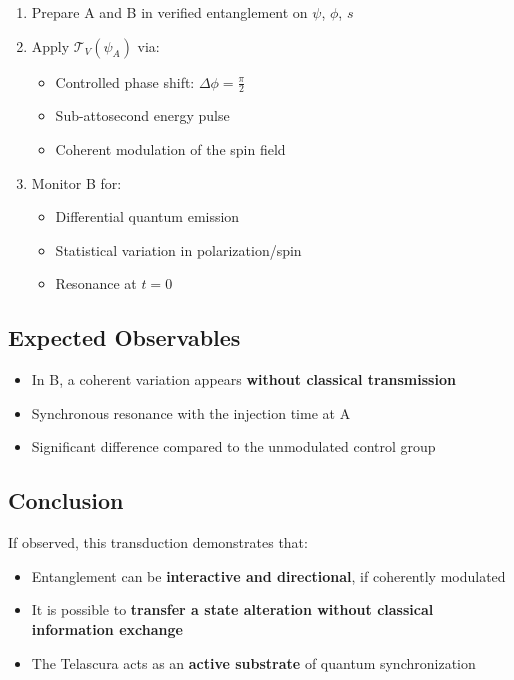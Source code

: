 \documentclass[12pt]{article}
\begin{document}
\begin{enumerate}
    \item Prepare A and B in verified entanglement on $\psi$, $\phi$, $s$
    \item Apply $\mathcal{T}_V(\psi_A)$ via:
    \begin{itemize}
        \item Controlled phase shift: $\Delta\phi = \frac{\pi}{2}$
        \item Sub-attosecond energy pulse
        \item Coherent modulation of the spin field
    \end{itemize}
    \item Monitor B for:
    \begin{itemize}
        \item Differential quantum emission
        \item Statistical variation in polarization/spin
        \item Resonance at $t = 0$
    \end{itemize}
\end{enumerate}

\subsection*{Expected Observables}
\begin{itemize}
    \item In B, a coherent variation appears \textbf{without classical transmission}
    \item Synchronous resonance with the injection time at A
    \item Significant difference compared to the unmodulated control group
\end{itemize}

\subsection*{Conclusion}

If observed, this transduction demonstrates that:
\begin{itemize}
    \item Entanglement can be \textbf{interactive and directional}, if coherently modulated
    \item It is possible to \textbf{transfer a state alteration without classical information exchange}
    \item The Telascura acts as an \textbf{active substrate} of quantum synchronization
\end{itemize}
\end{document}
